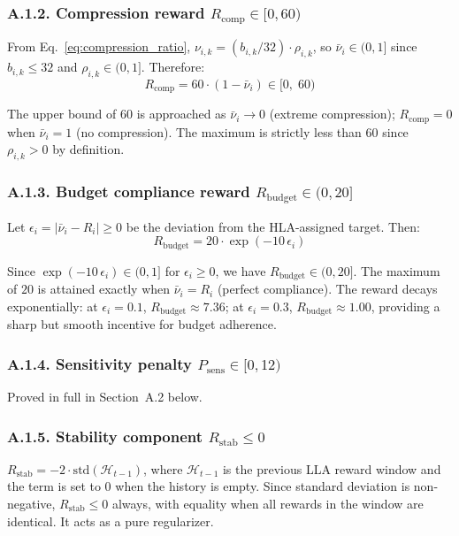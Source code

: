 \documentclass[preprint,12pt,authoryear]{elsarticle}
\begin{document}
\subsubsection*{A.1.2. Compression reward $R_{\mathrm{comp}} \in [0, 60)$}
From Eq.~\eqref{eq:compression_ratio}, $\nu_{i,k} = (b_{i,k}/32)\cdot\rho_{i,k}$,
so $\bar{\nu}_i \in (0, 1]$ since $b_{i,k} \leq 32$ and $\rho_{i,k} \in (0,1]$.
Therefore:
\begin{equation}
    R_{\mathrm{comp}} = 60 \cdot (1 - \bar{\nu}_i) \in [0,\; 60)
\end{equation}

The upper bound of $60$ is approached as $\bar{\nu}_i \to 0$ (extreme compression);
$R_{\mathrm{comp}} = 0$ when $\bar{\nu}_i = 1$ (no compression). The maximum is
strictly less than $60$ since $\rho_{i,k} > 0$ by definition.

\subsubsection*{A.1.3. Budget compliance reward $R_{\mathrm{budget}} \in (0, 20]$}
Let $\epsilon_i = |\bar{\nu}_i - R_i| \geq 0$ be the deviation from the HLA-assigned
target. Then:
\begin{equation}
    R_{\mathrm{budget}} = 20 \cdot \exp(-10\,\epsilon_i)
\end{equation}

Since $\exp(-10\,\epsilon_i) \in (0, 1]$ for $\epsilon_i \geq 0$, we have
$R_{\mathrm{budget}} \in (0, 20]$. The maximum of $20$ is attained exactly when
$\bar{\nu}_i = R_i$ (perfect compliance). The reward decays exponentially: at
$\epsilon_i = 0.1$, $R_{\mathrm{budget}} \approx 7.36$; at $\epsilon_i = 0.3$,
$R_{\mathrm{budget}} \approx 1.00$, providing a sharp but smooth incentive for budget
adherence.

\subsubsection*{A.1.4. Sensitivity penalty $P_{\mathrm{sens}} \in [0, 12)$}
Proved in full in Section~A.2 below.

\subsubsection*{A.1.5. Stability component $R_{\mathrm{stab}} \leq 0$}
$R_{\mathrm{stab}} = -2 \cdot \mathrm{std}(\mathcal{H}_{t-1})$, where $\mathcal{H}_{t-1}$
is the previous LLA reward window and the term is set to $0$ when the history is empty.
Since standard deviation is non-negative, $R_{\mathrm{stab}} \leq 0$ always, with equality
when all rewards in the window are identical. It acts as a pure regularizer.
\end{document}
